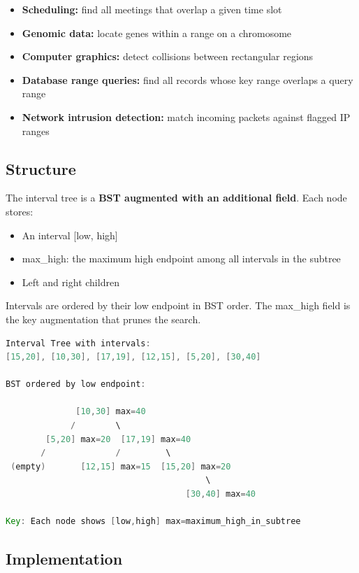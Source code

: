 \begin{itemize}
\item \textbf{Scheduling:} find all meetings that overlap a given time slot
\item \textbf{Genomic data:} locate genes within a range on a chromosome
\item \textbf{Computer graphics:} detect collisions between rectangular regions
\item \textbf{Database range queries:} find all records whose key range overlaps a query range
\item \textbf{Network intrusion detection:} match incoming packets against flagged IP ranges
\end{itemize}

\subsection{Structure}

The interval tree is a \textbf{BST augmented with an additional field}. Each node stores:
\begin{itemize}
\item An interval [low, high]
\item max\_high: the maximum high endpoint among all intervals in the subtree
\item Left and right children
\end{itemize}

Intervals are ordered by their low endpoint in BST order. The max\_high field is the key augmentation that prunes the search.

\begin{lstlisting}[language=Java]
Interval Tree with intervals:
[15,20], [10,30], [17,19], [12,15], [5,20], [30,40]

BST ordered by low endpoint:

              [10,30] max=40
             /        \
        [5,20] max=20  [17,19] max=40
       /              /         \
 (empty)       [12,15] max=15  [15,20] max=20
                                        \
                                    [30,40] max=40

Key: Each node shows [low,high] max=maximum_high_in_subtree
\end{lstlisting}

\subsection{Implementation}

